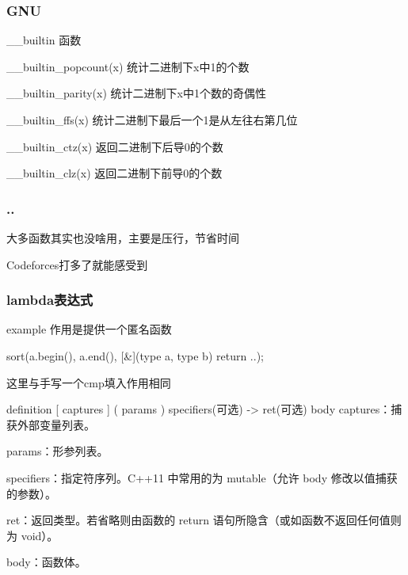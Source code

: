 \documentclass{beamer}
\begin{document}
  \begin{frame}
    \frametitle{GNU}

    \begin{block}{\_\_builtin 函数}

      \_\_builtin\_popcount(x) 统计二进制下x中1的个数

      \vspace*{1\baselineskip}
      
      \_\_builtin\_parity(x) 统计二进制下x中1个数的奇偶性
      
      \vspace*{1\baselineskip}
      
      \_\_builtin\_ffs(x) 统计二进制下最后一个1是从左往右第几位
      
      \vspace*{1\baselineskip}
      
      \_\_builtin\_ctz(x) 返回二进制下后导0的个数
      
      \vspace*{1\baselineskip}
      
      \_\_builtin\_clz(x) 返回二进制下前导0的个数
    \end{block}
    
  \end{frame}

  \begin{frame}
    \frametitle{..}
      大多函数其实也没啥用，主要是压行，节省时间

      Codeforces打多了就能感受到
  \end{frame}

  \begin{frame}
    \frametitle{lambda表达式}
    \begin{block}{example}
      作用是提供一个匿名函数
      
      sort(a.begin(), a.end(), [\&](type a, type b) {return ..});

      这里与手写一个cmp填入作用相同
    \end{block}

    \begin{block}{definition}
      [ captures ] ( params ) specifiers(可选) -> ret(可选) { body }
      captures：捕获外部变量列表。

      params：形参列表。
      
      specifiers：指定符序列。C++11 中常用的为 mutable（允许 body 修改以值捕获的参数）。
      
      ret：返回类型。若省略则由函数的 return 语句所隐含（或如函数不返回任何值则为 void）。
      
      body：函数体。
    \end{block}
  \end{frame}
\end{document}
